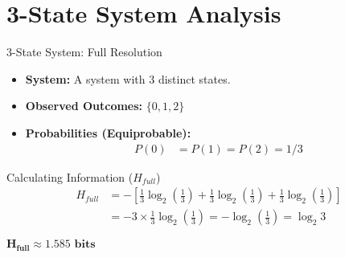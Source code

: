 \documentclass{beamer}
\begin{document}
\section{3-State System Analysis}
\begin{frame}{3-State System: Full Resolution}
    \begin{itemize}
        \item \textbf{System:} A system with 3 distinct states.
        \item \textbf{Observed Outcomes:} $\{0, 1, 2\}$
        \item \textbf{Probabilities (Equiprobable):}
            \begin{align*}
                P(0) &=
                P(1) =
                P(2) = 1/3
            \end{align*}
    \end{itemize}
    \pause
    \begin{block}{Calculating Information ($H_{full}$)}
        \begin{align*}
            H_{full} &= - \left[ \frac{1}{3} \log_2 \left(\frac{1}{3}\right) + \frac{1}{3} \log_2 \left(\frac{1}{3}\right) + \frac{1}{3} \log_2 \left(\frac{1}{3}\right) \right] \\
            &= -3 \times \frac{1}{3} \log_2 \left(\frac{1}{3}\right)
             = -\log_2 \left(\frac{1}{3}\right)
            = \log_2 3
        \end{align*}
        \begin{center}
            $\boldsymbol{H_{full} \approx 1.585 \text{ bits}}$
        \end{center}
    \end{block}
\end{frame}
\end{document}
